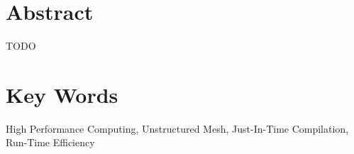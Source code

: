 
%
\vspace*{\fill}
\begin{adjustwidth}{60pt}{60pt}
\begin{center}
\section*{Abstract}
\normalsize
TODO\\
\lipsum[1]
\section*{Key Words}
High Performance Computing, Unstructured Mesh, Just-In-Time Compilation, Run-Time Efficiency
\end{center}
\end{adjustwidth}
\vspace*{\fill}
